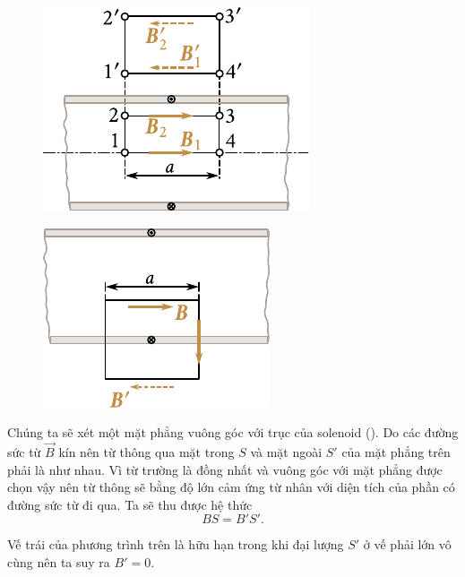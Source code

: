 \begin{figure}[t]
	\begin{minipage}[t]{0.48\linewidth}
		\begin{center}
			\includegraphics[scale=1]{figures/ch_06/fig_6_29.pdf}
			\caption[]{}
			\label{fig:6_29}
		\end{center}
	\end{minipage}
	\hfill{ }%
	\begin{minipage}[t]{0.48\linewidth}
		\begin{center}
			\includegraphics[scale=1]{figures/ch_06/fig_6_30.pdf}
			\caption[]{}
			\label{fig:6_30}
		\end{center}
	\end{minipage}
\vspace{-0.4cm}
\end{figure}

Chúng ta sẽ xét một mặt phẳng vuông góc với trục của solenoid (). Do các đường sức từ $\vec{B}$ kín nên từ thông qua mặt trong $S$ và mặt ngoài $S'$ của mặt phẳng trên phải là như nhau. Vì từ trường là đồng nhất và vuông góc với mặt phẳng được chọn vậy nên từ thông sẽ bằng độ lớn cảm ứng từ nhân với diện tích của phần có đường sức từ đi qua. Ta sẽ thu được hệ thức
\begin{equation*}
    BS = B'S'.
\end{equation*}

Vế trái của phương trình trên là hữu hạn trong khi đại lượng $S'$ ở vế phải lớn vô cùng nên ta suy ra $B'=0$.

